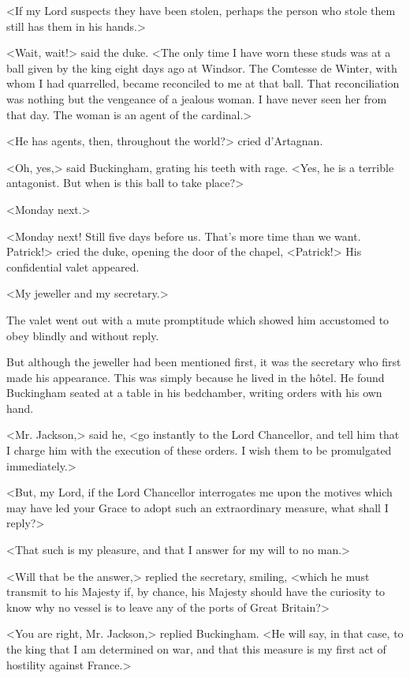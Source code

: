 <If my Lord suspects they have been stolen, perhaps the person who stole them still has them in his hands.> 

<Wait, wait!> said the duke. <The only time I have worn these studs was at a ball given by the king eight days ago at Windsor. The Comtesse de Winter, with whom I had quarrelled, became reconciled to me at that ball. That reconciliation was nothing but the vengeance of a jealous woman. I have never seen her from that day. The woman is an agent of the cardinal.> 

<He has agents, then, throughout the world?> cried d'Artagnan. 

<Oh, yes,> said Buckingham, grating his teeth with rage. <Yes, he is a terrible antagonist. But when is this ball to take place?> 

<Monday next.> 

<Monday next! Still five days before us. That's more time than we want. Patrick!> cried the duke, opening the door of the chapel, <Patrick!> His confidential valet appeared. 

<My jeweller and my secretary.> 

The valet went out with a mute promptitude which showed him accustomed to obey blindly and without reply. 

But although the jeweller had been mentioned first, it was the secretary who first made his appearance. This was simply because he lived in the hôtel. He found Buckingham seated at a table in his bedchamber, writing orders with his own hand. 

<Mr. Jackson,> said he, <go instantly to the Lord Chancellor, and tell him that I charge him with the execution of these orders. I wish them to be promulgated immediately.> 

<But, my Lord, if the Lord Chancellor interrogates me upon the motives which may have led your Grace to adopt such an extraordinary measure, what shall I reply?> 

<That such is my pleasure, and that I answer for my will to no man.> 

<Will that be the answer,> replied the secretary, smiling, <which he must transmit to his Majesty if, by chance, his Majesty should have the curiosity to know why no vessel is to leave any of the ports of Great Britain?> 

<You are right, Mr. Jackson,> replied Buckingham. <He will say, in that case, to the king that I am determined on war, and that this measure is my first act of hostility against France.> 

